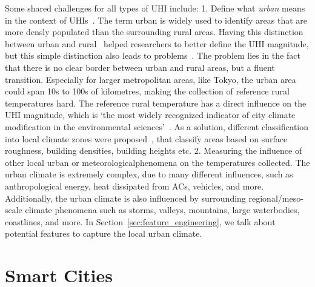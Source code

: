 Some shared challenges for all types of UHI include: 1. Define what \textit{urban} means in the context of UHIs~\cite{stewart2009newly}. The term urban is widely used to identify areas that are more densly populated than the surrounding rural areas. Having this distinction between urban and rural~\cite{lowry1977empirical} helped researchers to better define the UHI magnitude, but this simple distinction also leads to problems~\cite{stewart2011systematic}. The problem lies in the fact that there is no clear border between urban and rural areas, but a fluent transition. Especially for larger metropolitan areas, like Tokyo, the urban area could span 10s to 100s of kilometres, making the collection of reference rural temperatures hard. The reference rural temperature has a direct influence on the UHI magnitude, which is `the most widely recognized indicator of city climate modification in the environmental sciences'~\cite{stewart2009newly}. As a solution, different classification into local climate zones were proposed~\cite{stewart2012local, stewart2009newly}, that classify areas based on surface roughness, building densities, building heights etc. 2. Measuring the influence of other local urban or meteorologicalphenomena on the temperatures collected. The urban climate is extremely complex, due to many different influences, such as anthropological energy, heat dissipated from ACs, vehicles, and more. Additionally, the urban climate is also influenced by surrounding regional/meso-scale climate phenomena such as storms, valleys, mountains, large waterbodies, coastlines, and more. In Section~\ref{sec:feature_engineering}, we talk about potential features to capture the local urban climate.

\section{Smart Cities}

